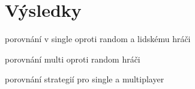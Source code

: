 \chapter{Výsledky}
porovnání v single oproti random a lidskému hráči

porovnání multi oproti random hráči

porovnání strategií pro single a multiplayer